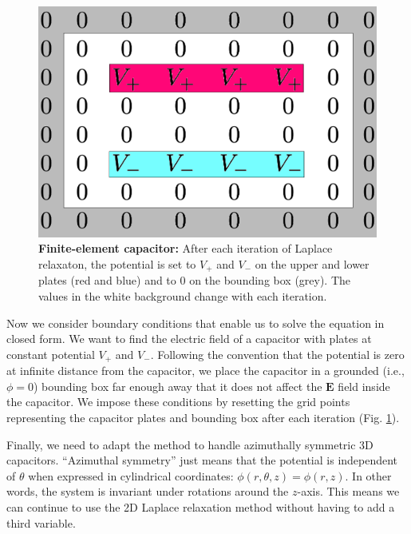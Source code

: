 \documentclass[twocolumn,aps,prl]{revtex4-1} %
\begin{document}
\begin{figure}
    \includegraphics[width=\columnwidth]{cap4.png}
    \caption{\textbf{Finite-element capacitor:} After each iteration of Laplace relaxaton, the potential is set to $V_+$ and $V_-$ on the upper and lower plates (red and blue) and to 0 on the bounding box (grey).  The values in the white background change with each iteration.}
    \label{fig:cap}
\end{figure}

Now we consider boundary conditions that enable us to solve the equation in closed form.  We want to find the electric field of a capacitor with plates at constant potential $V_+$ and $V_-$.  Following the convention that the potential is zero at infinite distance from the capacitor, we place the capacitor in a grounded (i.e., $\phi=0$) bounding box far enough away that it does not affect the $\mathbf{E}$ field inside the capacitor.  We impose these conditions by resetting the grid points representing the capacitor plates and bounding box after each iteration (Fig. \ref{fig:cap}).

Finally, we need to adapt the method to handle azimuthally symmetric 3D capacitors.  ``Azimuthal symmetry'' just means that the potential is independent of $\theta$ when expressed in cylindrical coordinates: $\phi(r,\theta,z) = \phi(r,z)$.  In other words, the system is invariant under rotations around the $z$-axis.  This means we can continue to use the 2D Laplace relaxation method without having to add a third variable.
\end{document}
